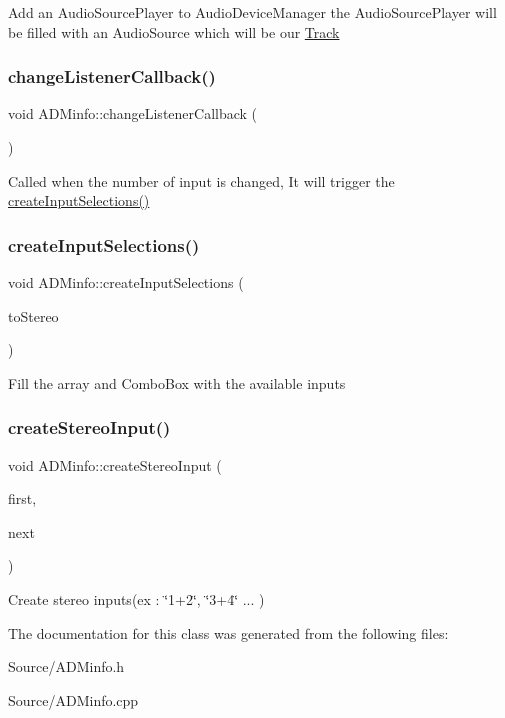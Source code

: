 Add an Audio\+Source\+Player to Audio\+Device\+Manager the Audio\+Source\+Player will be filled with an Audio\+Source which will be our \mbox{\hyperlink{class_track}{Track}} \mbox{\label{class_a_d_minfo_a50ddf84b1a57b99420f32c627040cde1}} 
\subsubsection{\texorpdfstring{changeListenerCallback()}{changeListenerCallback()}}
{\footnotesize\ttfamily void A\+D\+Minfo\+::change\+Listener\+Callback (\begin{DoxyParamCaption}\item[{Change\+Broadcaster $\ast$}]{ }\end{DoxyParamCaption})\hspace{0.3cm}{\ttfamily [override]}}

Called when the number of input is changed, It will trigger the \mbox{\hyperlink{class_a_d_minfo_a26182cce57f898d5b566ffee14e5e492}{create\+Input\+Selections()}} \mbox{\label{class_a_d_minfo_a26182cce57f898d5b566ffee14e5e492}} 
\subsubsection{\texorpdfstring{createInputSelections()}{createInputSelections()}}
{\footnotesize\ttfamily void A\+D\+Minfo\+::create\+Input\+Selections (\begin{DoxyParamCaption}\item[{Array$<$ int $>$}]{to\+Stereo }\end{DoxyParamCaption})}

Fill the array and Combo\+Box with the available inputs \mbox{\label{class_a_d_minfo_abddde8902010e825e82f3890e0f4280e}} 
\subsubsection{\texorpdfstring{createStereoInput()}{createStereoInput()}}
{\footnotesize\ttfamily void A\+D\+Minfo\+::create\+Stereo\+Input (\begin{DoxyParamCaption}\item[{int}]{first,  }\item[{int}]{next }\end{DoxyParamCaption})}

Create stereo inputs(ex \+: \char`\"{}1+2\char`\"{}, \char`\"{}3+4\char`\"{} ... ) 

The documentation for this class was generated from the following files\+:\begin{DoxyCompactItemize}
\item 
Source/A\+D\+Minfo.\+h\item 
Source/A\+D\+Minfo.\+cpp\end{DoxyCompactItemize}

